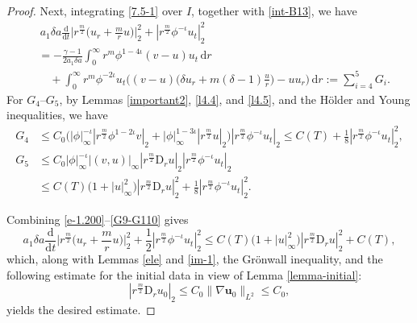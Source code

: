 \documentclass[11pt,reqno]{amsart}
\numberwithin{rk}{section}
\numberwithin{prop}{section}
\numberwithin{mydef}{section}
\numberwithin{lem}{section}
\numberwithin{equation}{section}
\numberwithin{thm}{section}
\begin{document}
\begin{proof}
Next, integrating \eqref{7.5-1} over $I$, together with \eqref{int-B13}, we have
\begin{equation}\label{e-1.200}
\begin{aligned}
&\,a_1\delta a\frac{\mathrm{d}}{\mathrm{d}t}\Big|r^\frac{m}{2}\big(u_r+\frac{m}{r}u\big)\Big|_2^2+|r^{\frac{m}{2}}\phi^{-\iota}u_t|_2^2\\
&= -\frac{\gamma-1}{2a_1\delta a}\int_0^\infty r^m\phi^{1-4\iota}(v-u)u_t\,\mathrm{d}r \\
&\quad + \int_0^\infty r^m\phi^{-2\iota} u_t\Big( (v-u)\big(\delta u_r+m(\delta-1)\frac{u}{r}\big)-uu_r\Big)\,\mathrm{d}r:=\sum_{i=4}^{5} G_i.
\end{aligned}
\end{equation}
For $G_4$--$G_{5}$, by Lemmas \ref{important2}, \ref{l4.4}, 
and \ref{l4.5}, and the H\"older and Young inequalities, we have
\begin{equation}\label{G9-G110}
\begin{aligned}
G_4&\leq  C_0\big(|\phi|_\infty^{-\iota}|r^{\frac{m}{2}} \phi^{1-2\iota} v|_{2} + |\phi|_\infty^{1-3\iota} |r^{\frac{m}{2}}u|_2\big) |r^{\frac{m}{2}}\phi^{-\iota}u_t|_2\leq C(T)+\frac{1}{8} |r^{\frac{m}{2}}\phi^{-\iota}u_t|^2_2,\\
G_5&\leq C_0|\phi|_\infty^{-\iota}|(v,u)|_{\infty} |r^{\frac{m}{2}}\mathrm{D}_r u|_{2}|r^{\frac{m}{2}}\phi^{-\iota}u_t|_{2}\\
&\leq C(T)\big(1+|u|_{\infty}^2\big) |r^{\frac{m}{2}}\mathrm{D}_r u|_{2}^2+\frac{1}{8}|r^{\frac{m}{2}}\phi^{-\iota}u_t|_{2}^2.
\end{aligned}    
\end{equation}

Combining \eqref{e-1.200}--\eqref{G9-G110} gives
\begin{equation*}
a_1\delta a\frac{\mathrm{d}}{\mathrm{d}t}\Big|r^\frac{m}{2}\big(u_r+\frac{m}{r}u\big)\Big|_2^2+\frac{1}{2}|r^{\frac{m}{2}}\phi^{-\iota}u_t|_2^2\leq C(T)\big(1+|u|_{\infty}^2\big) |r^{\frac{m}{2}}\mathrm{D}_r u|_{2}^2+C(T),
\end{equation*}
which, along with Lemmas \ref{ele} and \ref{im-1}, the Gr\"onwall inequality, and the following estimate for the initial data in view of Lemma \ref{lemma-initial}:
\begin{equation*}
|r^\frac{m}{2}\mathrm{D}_r u_0|_2\leq C_0\|\nabla \boldsymbol{u}_0\|_{L^2}\leq C_0,
\end{equation*}
yields the desired estimate.
\end{proof}
\end{document}
